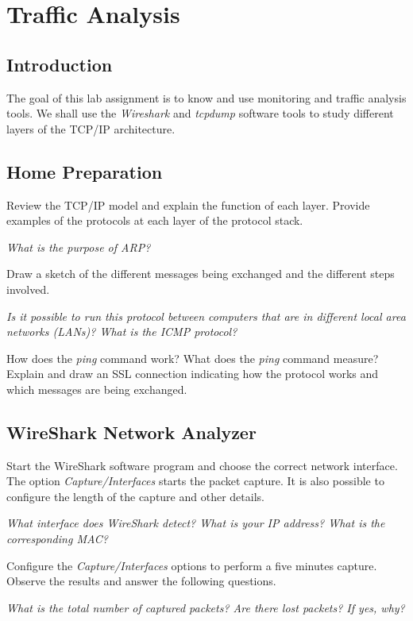 \chapter{Traffic Analysis}

\section{Introduction}

The goal of this lab assignment is to know and use monitoring and traffic analysis tools. We shall use the \emph{Wireshark} and \emph{tcpdump} software tools to study different layers of the TCP/IP architecture.

\section{Home Preparation}

Review the TCP/IP model and explain the function of each layer. Provide examples of the protocols at each layer of the protocol stack.

\emph{What is the purpose of ARP?}

Draw a sketch of the different messages being exchanged and the different steps involved.

\emph{Is it possible to run this protocol between computers that are in different local area networks (LANs)? What is the ICMP protocol?}

How does the \emph{ping} command work?
What does the \emph{ping} command measure?
Explain and draw an SSL connection indicating how the protocol works and which messages are being exchanged.

\section{WireShark Network Analyzer}

Start the WireShark software program and choose the correct network interface. The option \emph{Capture/Interfaces} starts the packet capture. It is also possible to configure the length of the capture and other details.

\emph{What interface does WireShark detect? What is your IP address? What is the corresponding MAC?}

Configure the \emph{Capture/Interfaces} options to perform a five minutes capture. Observe the results and answer the following questions.

\emph{What is the total number of captured packets? Are there lost packets? If yes, why?}

